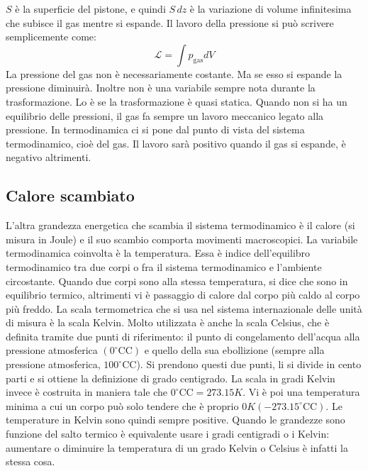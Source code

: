 \documentclass[10pt,a4paper]{book}
\renewcommand{\degree}{^\circ\text{C}} %
\begin{document}
$S$ è la superficie del pistone, e quindi $S\,dz$ è la variazione di volume infinitesima che subisce il gas mentre si espande. Il lavoro della pressione si può scrivere semplicemente come:
\[
	\boxed{\mathcal{L} = \int p_{\text{gas}}dV}
\]
La pressione del gas non è necessariamente costante. Ma se esso si espande la pressione diminuirà. Inoltre non è una variabile sempre nota durante la trasformazione. Lo è se la trasformazione è quasi statica. Quando non si ha un equilibrio delle pressioni, il gas fa sempre un lavoro meccanico legato alla pressione. In termodinamica ci si pone dal punto di vista del sistema termodinamico, cioè del gas. Il lavoro sarà positivo quando il gas si espande, è negativo altrimenti.

\subsection{Calore scambiato}

L'altra grandezza energetica che scambia il sistema termodinamico è il calore (si misura in Joule) e il suo scambio comporta movimenti macroscopici. La variabile termodinamica coinvolta è la temperatura. Essa è indice dell'equilibro termodinamico tra due corpi o fra il sistema termodinamico e l'ambiente circostante. Quando due corpi sono alla stessa temperatura, si dice che sono in equilibrio termico, altrimenti vi è passaggio di calore dal corpo più caldo al corpo più freddo. La scala termometrica che si usa nel sistema internazionale delle unità di misura è la scala Kelvin. Molto utilizzata è anche la scala Celsius, che è definita tramite due punti di riferimento: il punto di congelamento dell'acqua alla pressione atmosferica $(0 \degree \text{C})$ e quello della sua ebollizione (sempre alla pressione atmosferica, $100 \degree \text{C}$). Si prendono questi due punti, li si divide in cento parti e si ottiene la definizione di grado centigrado. La scala in gradi Kelvin invece è costruita in maniera tale che $0 \degree \text{C} =273.15 K$. Vi è poi una temperatura minima a cui un corpo può solo tendere che è proprio $0 K (-273.15 \degree \text{C})$. Le temperature in Kelvin sono quindi sempre positive. Quando le grandezze sono funzione del salto termico è equivalente usare i gradi centigradi o i Kelvin: aumentare o diminuire la temperatura di un grado Kelvin o Celsius è infatti la stessa cosa.
\end{document}
